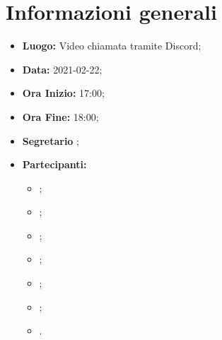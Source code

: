 \section{Informazioni generali}
	\begin{itemize}
		\item \textbf{Luogo:} Video chiamata tramite Discord;
		\item \textbf{Data:} 2021-02-22;
		\item \textbf{Ora Inizio:} 17:00;
		\item \textbf{Ora Fine:} 18:00;
		\item \textbf{Segretario} \GB ;
		\item \textbf{Partecipanti:}
		\begin{itemize}
			\item \MB ;
			\item \VAS ;
			\item \FD ;
			\item \NM ;
			\item \SB ;
			\item \GB ;
			\item \MDI .
		\end{itemize}
		
	\end{itemize}